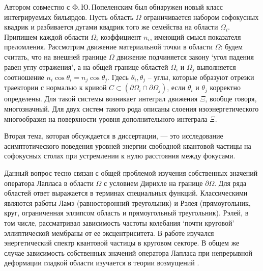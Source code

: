 
Автором совместно с Ф.\,Ю.\,Попеленским был обнаружен новый класс интегрируемых бильярдов.
Пусть область $\Omega$ ограничивается набором софокусных квадрик и разбивается дугами квадрик того же семейства на области $\Omega_i$. Припишем каждой области $\Omega_i$ коэффициент $n_i$, имеющий смысл показателя преломления.
Рассмотрим движение материальной точки в области $\Omega$: будем считать, что на внешней границе $\Omega$ движение подчиняется закону `угол падения равен углу отражения', а на общей границе областей $\Omega_i$ и $\Omega_j$ выполняется соотношение $n_i \cos \theta_i = n_j \cos \theta_j$. Гдесь $\theta_i, \theta_j$ -- углы, которые образуют отрезки траектории с нормалью к кривой $C \subset (\partial \Omega_i \cap \partial \Omega_j)$, если $\theta_i$ и $\theta_j$ корректно определены. 
Для такой системы возникает интеграл движения $\Xi$, вообще говоря, многозначный. Для двух систем такого рода описаны слоения изоэнергетического многообразия на поверхности уровня дополнительного интеграла $\Xi$. 
\bigskip

Вторая тема, которая обсуждается в диссертации, --- это исследование асимптотического поведения уровней энергии свободной квантовой частицы на софокусных столах при устремлении к нулю расстояния между фокусами.

Данный вопрос тесно связан с общей проблемой изучения собственных значений оператора Лапласа в области $\Omega$ с условием Дирихле на границе $\partial \Omega$.
Для ряда областей ответ выражается в терминах специальных функций. Классическими являются работы Ламэ \cite{lame1852leccons} (равносторонний треугольник) и Рэлея \cite{wref13} (прямоугольник, круг, ограниченная эллипсом область и прямоугольный треугольник). 
Рэлей, в том числе, рассматривал зависимость частоты колебания `почти круговой' эллиптической мембраны от ее эксцентриситета.
В работе \cite{wref13} изучался энергетический спектр квантовой частицы в круговом секторе.
В общем же случае зависимость собственных значений оператора Лапласа при непрерывной деформации гладкой области изучается в теории возмущений \cite{kato2013perturbation, rellich1969perturbation}. 


